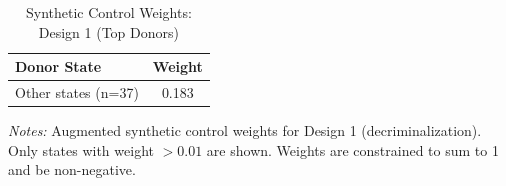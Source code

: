 \begin{table}[H]
\centering
\caption{Synthetic Control Weights: Design 1 (Top Donors)}
\label{tab:weights}
\begin{threeparttable}
\begin{tabular}{lc}
\toprule
Donor State & Weight \\
\midrule
\midrule
Other states (n=37) & 0.183 \\
\bottomrule
\end{tabular}
\begin{tablenotes}[flushleft]
\small
\item \textit{Notes:} Augmented synthetic control weights for Design 1 (decriminalization). Only states with weight $> 0.01$ are shown. Weights are constrained to sum to 1 and be non-negative.
\end{tablenotes}
\end{threeparttable}
\end{table}
